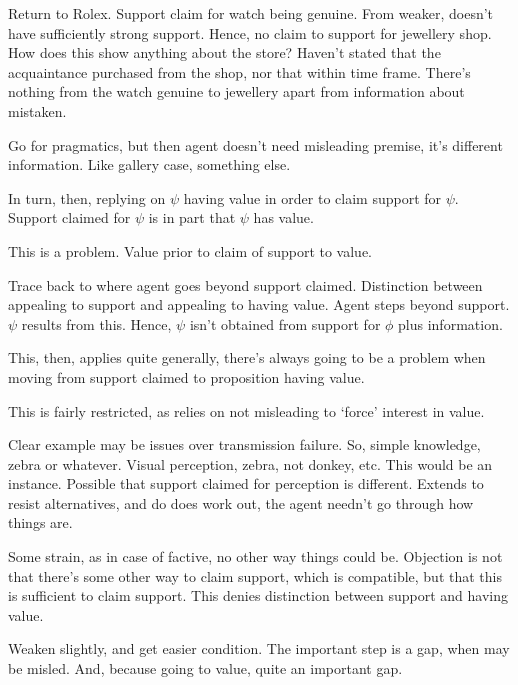 \begin{note}
  Return to Rolex.
  Support claim for watch being genuine.
  From weaker,  doesn't have sufficiently strong support.
  Hence, no claim to support for jewellery shop.
  How does this show anything about the store?
  Haven't stated that the acquaintance purchased from the shop, nor that within time frame.
  There's nothing from the watch genuine to jewellery apart from information about mistaken.

  Go for pragmatics, but then agent doesn't need misleading premise, it's different information.
  Like gallery case, something else.

  








  In turn, then, replying on \(\psi\) having value in order to claim support for \(\psi\).
  Support claimed for \(\psi\) is in part that \(\psi\) has value.

  This is a problem.
  Value prior to claim of support to value.

  Trace back to where agent goes beyond support claimed.
  Distinction between appealing to support and appealing to having value.
  Agent steps beyond support.
  \(\psi\) results from this.
  Hence, \(\psi\) isn't obtained from support for \(\phi\) plus information.

  This, then, applies quite generally, there's always going to be a problem when moving from support claimed to proposition having value.

  This is fairly restricted, as relies on not misleading to `force' interest in value.

  Clear example may be issues over transmission failure.
  So, simple knowledge, zebra or whatever.
  Visual perception, zebra, not donkey, etc.
  This would be an instance.
  Possible that support claimed for perception is different.
  Extends to resist alternatives, and do does work out, the agent needn't go through how things are.

  Some strain, as in case of factive, no other way things could be.
  Objection is not that there's some other way to claim support, which is compatible, but that this is sufficient to claim support.
  This denies distinction between support and having value.

  Weaken slightly, and get easier condition.
  The important step is a gap, when may be misled.
  And, because going to value, quite an important gap.
\end{note}




